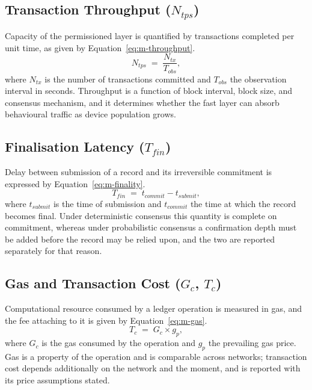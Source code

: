 \subsection{Transaction Throughput ($N_{tps}$)}
\label{sec:metric-throughput}

Capacity of the permissioned layer is quantified by transactions completed per unit time, as given by Equation~\eqref{eq:m-throughput}.
\begin{equation}
\label{eq:m-throughput}
N_{tps} \;=\; \frac{N_{tx}}{T_{obs}} ,
\end{equation}
where $N_{tx}$ is the number of transactions committed and $T_{obs}$ the observation interval in seconds. Throughput is a function of block interval, block size, and consensus mechanism, and it determines whether the fast layer can absorb behavioural traffic as device population grows.

\subsection{Finalisation Latency ($T_{fin}$)}
\label{sec:metric-finality}

Delay between submission of a record and its irreversible commitment is expressed by Equation~\eqref{eq:m-finality}.
\begin{equation}
\label{eq:m-finality}
T_{fin} \;=\; t_{commit} - t_{submit} ,
\end{equation}
where $t_{submit}$ is the time of submission and $t_{commit}$ the time at which the record becomes final. Under deterministic consensus this quantity is complete on commitment, whereas under probabilistic consensus a confirmation depth must be added before the record may be relied upon, and the two are reported separately for that reason.

\subsection{Gas and Transaction Cost ($G_{c}$, $T_{c}$)}
\label{sec:metric-gas}

Computational resource consumed by a ledger operation is measured in gas, and the fee attaching to it is given by Equation~\eqref{eq:m-gas}.
\begin{equation}
\label{eq:m-gas}
T_{c} \;=\; G_{c} \times g_{p} ,
\end{equation}
where $G_{c}$ is the gas consumed by the operation and $g_{p}$ the prevailing gas price. Gas is a property of the operation and is comparable across networks; transaction cost depends additionally on the network and the moment, and is reported with its price assumptions stated.

